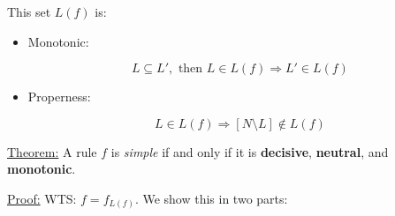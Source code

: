 \documentclass{article}
\begin{document}
This set $L(f)$ is:

\begin{itemize}

\item Monotonic:

\[
L \subseteq L', \text{ then } L \in L(f) \Rightarrow L'\in L(f)
\]


\item Properness:

\[
L \in L(f) \Rightarrow [N\setminus L ]\not \in L(f)
\]
\end{itemize}

\underline{Theorem:}
A rule $f$ is \emph{simple} if and only if it is \textbf{decisive}, \textbf{neutral}, and \textbf{monotonic}.

\underline{Proof:}
WTS: $f = f_{L(f)}$. We show this in two parts:
\end{document}
